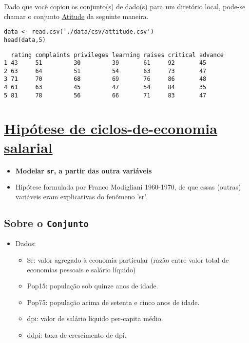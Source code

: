 \documentclass[12pt]{abntex2}
\begin{document}
Dado que você copiou os conjunto(s) de dado(s) para um diretório
local, pode-se chamar o conjunto \href{https://drive.google.com/file/d/1rKj4NPD61bWKD6HBC4fux2Eit6CNEKwr/view?usp=sharing}{Atitude} da seguinte maneira.

\begin{verbatim}
data <- read.csv('./data/csv/attitude.csv')
head(data,5)
\end{verbatim}

\begin{verbatim}
  rating complaints privileges learning raises critical advance
1 43     51         30         39       61     92       45     
2 63     64         51         54       63     73       47     
3 71     70         68         69       76     86       48     
4 61     63         45         47       54     84       35     
5 81     78         56         66       71     83       47     
\end{verbatim}

\section{\href{https://r-data.pmagunia.com/dataset/r-dataset-package-datasets-lifecyclesavings}{Hipótese de ciclos-de-economia salarial}}
\label{sec:orgf57994f}
\begin{itemize}
\item \textbf{Modelar \texttt{sr}, a partir das outra variáveis}
\item Hipótese formulada por Franco Modigliani 1960-1970, de que essas (outras)
variáveis eram explicativas do fenômeno 'sr'.
\end{itemize}
\subsection{Sobre o \texttt{Conjunto}}
\label{sec:orgd4e28b7}
\begin{itemize}
\item Dados:
\begin{itemize}
\item Sr: valor agregado à economia particular (razão entre valor total de economias pessoais e salário líquido)
\item Pop15: população sob quinze anos de idade.
\item Pop75: população acima de setenta e cinco anos de idade.
\item dpi: valor de salário líquido per-capita médio.
\item ddpi: taxa de crescimento de dpi.
\end{itemize}
\end{itemize}
\end{document}
